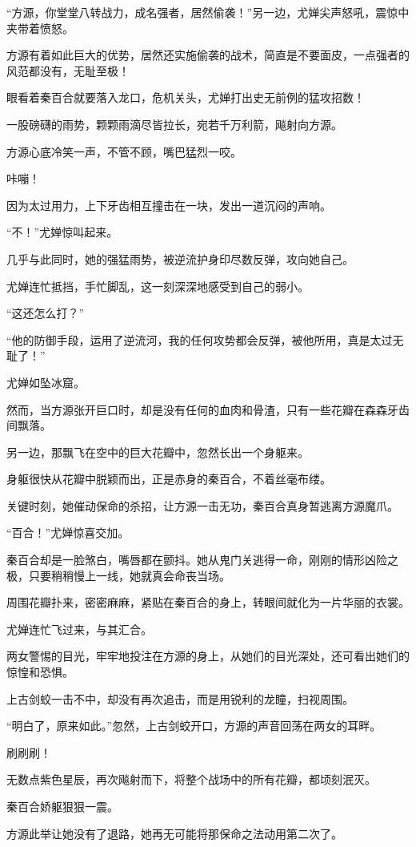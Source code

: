 \begin{this_body}
“方源，你堂堂八转战力，成名强者，居然偷袭！”另一边，尤婵尖声怒吼，震惊中夹带着愤怒。

方源有着如此巨大的优势，居然还实施偷袭的战术，简直是不要面皮，一点强者的风范都没有，无耻至极！

眼看着秦百合就要落入龙口，危机关头，尤婵打出史无前例的猛攻招数！

一股磅礴的雨势，颗颗雨滴尽皆拉长，宛若千万利箭，飚射向方源。

方源心底冷笑一声，不管不顾，嘴巴猛烈一咬。

咔嘣！

因为太过用力，上下牙齿相互撞击在一块，发出一道沉闷的声响。

“不！”尤婵惊叫起来。

几乎与此同时，她的强猛雨势，被逆流护身印尽数反弹，攻向她自己。

尤婵连忙抵挡，手忙脚乱，这一刻深深地感受到自己的弱小。

“这还怎么打？”

“他的防御手段，运用了逆流河，我的任何攻势都会反弹，被他所用，真是太过无耻了！”

尤婵如坠冰窟。

然而，当方源张开巨口时，却是没有任何的血肉和骨渣，只有一些花瓣在森森牙齿间飘落。

另一边，那飘飞在空中的巨大花瓣中，忽然长出一个身躯来。

身躯很快从花瓣中脱颖而出，正是赤身的秦百合，不着丝毫布缕。

关键时刻，她催动保命的杀招，让方源一击无功，秦百合真身暂逃离方源魔爪。

“百合！”尤婵惊喜交加。

秦百合却是一脸煞白，嘴唇都在颤抖。她从鬼门关逃得一命，刚刚的情形凶险之极，只要稍稍慢上一线，她就真会命丧当场。

周围花瓣扑来，密密麻麻，紧贴在秦百合的身上，转眼间就化为一片华丽的衣裳。

尤婵连忙飞过来，与其汇合。

两女警惕的目光，牢牢地投注在方源的身上，从她们的目光深处，还可看出她们的惊惶和恐惧。

上古剑蛟一击不中，却没有再次追击，而是用锐利的龙瞳，扫视周围。

“明白了，原来如此。”忽然，上古剑蛟开口，方源的声音回荡在两女的耳畔。

刷刷刷！

无数点紫色星辰，再次飚射而下，将整个战场中的所有花瓣，都顷刻泯灭。

秦百合娇躯狠狠一震。

方源此举让她没有了退路，她再无可能将那保命之法动用第二次了。


\end{this_body}
